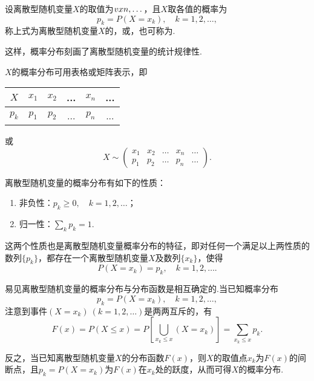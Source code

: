 \begin{definition}
设离散型随机变量\(X\)的取值为\(v{x}{n},\dotsc\)，且\(X\)取各值的概率为\[
p_k = P(X=x_k), \quad k=1,2,\dotsc,
\]称上式为离散型随机变量\(X\)的，或，也可称为.
\end{definition}

这样，概率分布刻画了离散型随机变量的统计规律性.

\(X\)的概率分布可用表格或矩阵表示，即
\begin{center}
\begin{tabular}{c|*{5}{c}}
\hline
\(X\) & \(x_1\) & \(x_2\) & ... & \(x_n\) & ... \\ \hline
\(p_k\) & \(p_1\) & \(p_2\) & ... & \(p_n\) & ... \\ \hline
\end{tabular}
\end{center}
或
\[
X \sim \begin{pmatrix}
x_1 & x_2 & \dots & x_n & \dots \\
p_1 & p_2 & \dots & p_n & \dots
\end{pmatrix}.
\]

\begin{property}\label{theorem:随机变量及其分布.离散型随机变量的密度函数的性质}
离散型随机变量的概率分布有如下的性质：
\begin{enumerate}
\item 非负性：\(p_k \geqslant 0, \quad k = 1,2,\dots\)；
\item 归一性：\(\sum\limits_{k}{p_k} = 1\).
\end{enumerate}
\end{property}

这两个性质也是离散型随机变量概率分布的特征，即对任何一个满足以上两性质的数列\(\{p_k\}\)，都存在一个离散型随机变量\(X\)及数列\(\{x_k\}\)，使得\[
P(X=x_k) = p_k,
\quad k=1,2,\dotsc.
\]

易见离散型随机变量的概率分布与分布函数是相互确定的.当已知概率分布\[
p_k = P(X=x_k),
\quad k=1,2,\dotsc,
\]注意到事件\((X=x_k)\ (k=1,2,\dotsc)\)是两两互斥的，有\begin{equation}
F(x) = P(X \leqslant x)
= P\left[ \bigcup_{x_k \leqslant x} (X = x_k) \right]
= \sum\limits_{x_k \leqslant x} p_k.
\end{equation}

反之，当已知离散型随机变量\(X\)的分布函数\(F(x)\)，则\(X\)的取值点\(x_k\)为\(F(x)\)的间断点，且\(p_k = P(X=x_k)\)为\(F(x)\)在\(x_k\)处的跃度，从而可得\(X\)的概率分布.

